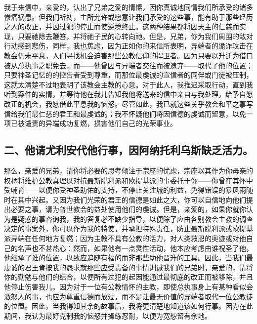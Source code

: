 我于来信中，亲爱的，认出了兄弟之爱的情愫，因你真诚地同情我们所承受的诸多惨痛祸患。但我们祈祷，主所允许或愿意让我们承受的这些事，能有助于那些经历之人的改正，并因过犯的停止而使逆境终止。这两种结果都将因天主的仁慈而实现，只要祂除去鞭笞，并将祂子民的心转向祂。但是，兄弟，你为我们周围的敌对行动感到悲伤，同样，我也焦虑，因为正如你的来信所表明，异端者的诡诈攻击在教会仍未平息，人们寻找机会迫害那些公教信仰的捍卫者。因为只要以升迁为借口被从总执事之职免去，而——他曾因与异端者交往而被遗弃——取代了他的位置；只要神圣记忆的的控告者受到尊重，而那位最虔诚的宣信者的同伴或门徒被压制，这就太清楚不过地表明了该教会主教的心意。对于此人，我推迟采取行动，直到我听到案件的实情，并等待他在我儿告知我他将送来的信中亲自与我处理，给予自愿改正的机会，我愿借此平息我的恼怒。尽管如此，我已就这些关乎教会和平之事写信给我们最仁慈的君王和最虔诚的；我不怀疑他们将因信德的虔诚而留意，以免一项已被谴责的异端成功复燃，损害他们自己的光荣事业。\par


\subsection{二、他请尤利安代他行事，因阿纳托利乌斯缺乏活力。}

那么，亲爱的兄弟，请你将必要的思考倾注于宗座的忧虑，宗座以其作为你母亲的权柄将维护公教真理以对抗聂斯脱利派和欧提基派的事委托于你——你曾在其怀中受哺育——以便你受神圣助佑的支持，不停止关注城的利益，免得错误的暴风雨随时在其中兴起。又因为我们光荣的君王的信德是如此之大，你可以自信地向他们提出必要之事，请为普世教会的益处使用他们的虔诚。但是，亲爱的，如果你就你认为是疑惑的事咨询我，我的答复必不缺少指导，以便除了应由各别教会主教的调查决定的事案外，你可以作为我的特使，并承担特殊责任，防止聂斯脱利派或欧提基派异端在任何地方复燃；因为主教不具有公教的活力，对人类救恩的奥迹或对他自己的名声也不甚热心：然而，如果他有一点灵性活动，他本应考虑由谁祝圣了他，他继承了谁的位置，以致应追随有福的而非那些助他晋升的工具。因此，当我们最虔诚的君王肯按我的恳求就那些应受责备的事情训诫我们的兄弟时，亲爱的，请将你的勤勉与他们的结合，以便所有过犯的起因能通过最彻底的改正而被移除，并且他停止伤害我儿。因为对于一位有公教情怀的主教，即使总执事身上有某种看似会激怒人的事，也应为尊重信德而放过，而不是让最无价值的异端者取代一位公教徒的位置。因此，当我得知其余的故事后，我将更清楚地知道该如何行事。因为在此期间，我认为最好克制我的恼怒并操练忍耐，以便为宽恕留有余地。\par

